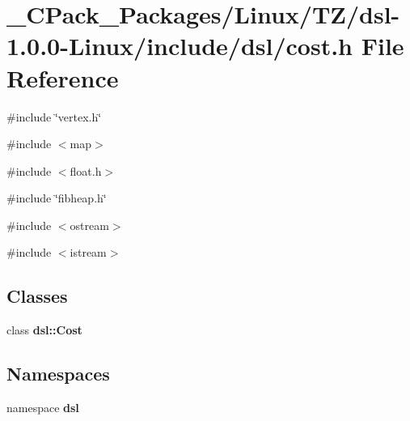 \section{\_\-CPack\_\-Packages/Linux/TZ/dsl-\/1.0.0-\/Linux/include/dsl/cost.h File Reference}
\label{__CPack__Packages_2Linux_2TZ_2dsl-1_80_80-Linux_2include_2dsl_2cost_8h}
{\ttfamily \#include \char`\"{}vertex.h\char`\"{}}\par
{\ttfamily \#include $<$map$>$}\par
{\ttfamily \#include $<$float.h$>$}\par
{\ttfamily \#include \char`\"{}fibheap.h\char`\"{}}\par
{\ttfamily \#include $<$ostream$>$}\par
{\ttfamily \#include $<$istream$>$}\par
\subsection*{Classes}
\begin{DoxyCompactItemize}
\item 
class {\bf dsl::Cost}
\end{DoxyCompactItemize}
\subsection*{Namespaces}
\begin{DoxyCompactItemize}
\item 
namespace {\bf dsl}
\end{DoxyCompactItemize}
